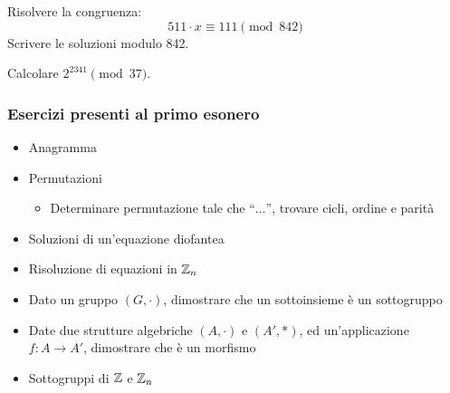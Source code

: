 \begin{esercizio}
Risolvere la congruenza:
\[
511 \cdot x \equiv 111 \pmod{842}
\]
Scrivere le soluzioni modulo 842.
\end{esercizio}

\begin{esercizio}
Calcolare $2^{2341} \pmod{37}$.
\end{esercizio}

\subsubsection{Esercizi presenti al primo esonero}
\begin{itemize}
    \item Anagramma
    \item Permutazioni
        \begin{itemize}
            \item Determinare permutazione tale che ``$\dots$'', trovare cicli, ordine e parit\`a
        \end{itemize}
    \item Soluzioni di un'equazione diofantea
    \item Risoluzione di equazioni in $\mathbb{Z}_n$
    \item Dato un gruppo $(G, \cdot)$, dimostrare che un sottoinsieme \`e un sottogruppo
    \item Date due strutture algebriche $(A, \cdot)$ e $(A', \ast)$, ed un'applicazione $f : A \to A'$, dimostrare che \`e un morfismo
    \item Sottogruppi di $\mathbb{Z}$ e $\mathbb{Z}_n$
\end{itemize}


























